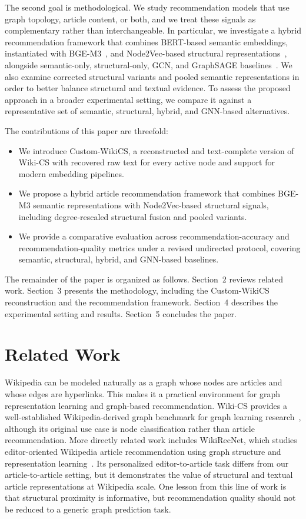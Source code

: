 \documentclass[runningheads]{llncs}
\begin{document}
The second goal is methodological. We study recommendation models that use
graph topology, article content, or both, and we treat these signals as
complementary rather than interchangeable. In particular, we investigate a
hybrid recommendation framework that combines BERT-based semantic embeddings,
instantiated with BGE-M3~\cite{chen2024m3embedding}, and Node2Vec-based structural
representations~\cite{grover2016node2vec}, alongside semantic-only,
structural-only, GCN, and GraphSAGE baselines~\cite{kipf2017semi,hamilton2017inductive}.
We also examine corrected structural variants and pooled semantic
representations in order to better balance structural and textual evidence. To
assess the proposed approach in a broader experimental setting, we compare it
against a representative set of semantic, structural, hybrid, and GNN-based
alternatives.

The contributions of this paper are threefold:
\begin{itemize}
\item We introduce Custom-WikiCS, a reconstructed and text-complete version of
      Wiki-CS with recovered raw text for every active node and support for
      modern embedding pipelines.
\item We propose a hybrid article recommendation framework that combines
      BGE-M3 semantic representations with Node2Vec-based structural signals,
      including degree-rescaled structural fusion and pooled variants.
\item We provide a comparative evaluation across recommendation-accuracy and
      recommendation-quality metrics under a revised undirected protocol,
      covering semantic, structural, hybrid, and GNN-based baselines.
\end{itemize}

The remainder of the paper is organized as follows. Section~2 reviews related
work. Section~3 presents the methodology, including the Custom-WikiCS
reconstruction and the recommendation framework. Section~4 describes the
experimental setting and results. Section~5 concludes the paper.

\section{Related Work}

Wikipedia can be modeled naturally as a graph whose nodes are articles and
whose edges are hyperlinks. This makes it a practical environment for graph
representation learning and graph-based recommendation. Wiki-CS provides a
well-established Wikipedia-derived graph benchmark for graph learning
research~\cite{mernyei2020wikics}, although its original use case is node
classification rather than article recommendation. More directly related work
includes WikiRecNet, which studies editor-oriented Wikipedia article
recommendation using graph structure and representation learning~\cite{wikirecnet2020}.
Its personalized editor-to-article task differs from our article-to-article
setting, but it demonstrates the value of structural and textual article
representations at Wikipedia scale. One lesson
from this line of work is that structural proximity is informative, but
recommendation quality should not be reduced to a generic graph prediction task.
\end{document}
